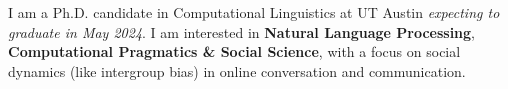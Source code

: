 I am a Ph.D. candidate in Computational Linguistics at UT Austin \emph{expecting to graduate in May 2024}. I am interested in \textbf{Natural Language Processing}, \textbf{Computational Pragmatics \& Social Science}, with a focus on social dynamics (like intergroup bias) in online conversation and communication.
